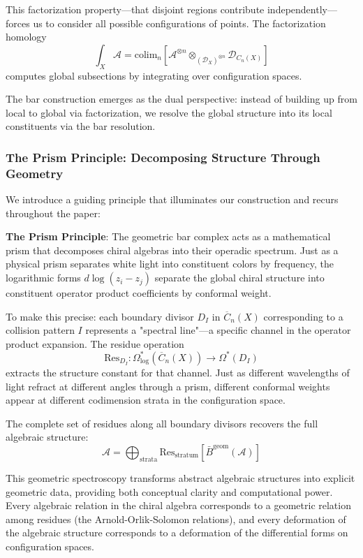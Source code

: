 This factorization property—that disjoint regions contribute independently—forces us to consider all possible configurations of points. The factorization homology
$$\int_X \mathcal{A} = \text{colim}_n \left[ \mathcal{A}^{\otimes n} \otimes_{(\mathcal{D}_X)^{\otimes n}} \mathcal{D}_{C_n(X)} \right]$$
computes global subsections by integrating over configuration spaces.

The bar construction emerges as the dual perspective: instead of building up from local to global via factorization, we resolve the global structure into its local constituents via the bar resolution.

\subsubsection{The Prism Principle: Decomposing Structure Through Geometry}

We introduce a guiding principle that illuminates our construction and recurs throughout the paper:

\textbf{The Prism Principle}: The geometric bar complex acts as a mathematical prism that decomposes chiral algebras into their operadic spectrum. Just as a physical prism separates white light into constituent colors by frequency, the logarithmic forms $d\log(z_i - z_j)$ separate the global chiral structure into constituent operator product coefficients by conformal weight.

To make this precise: each boundary divisor $D_I$ in $\overline{C}_n(X)$ corresponding to a collision pattern $I$ represents a "spectral line"—a specific channel in the operator product expansion. The residue operation
$$\text{Res}_{D_I}: \Omega^*_{\text{log}}(\overline{C}_n(X)) \to \Omega^*(D_I)$$
extracts the structure constant for that channel. Just as different wavelengths of light refract at different angles through a prism, different conformal weights appear at different codimension strata in the configuration space.

The complete set of residues along all boundary divisors recovers the full algebraic structure:
$$\mathcal{A} = \bigoplus_{\text{strata}} \text{Res}_{\text{stratum}}[\bar{B}^{\text{geom}}(\mathcal{A})]$$

This geometric spectroscopy transforms abstract algebraic structures into explicit geometric data, providing both conceptual clarity and computational power. Every algebraic relation in the chiral algebra corresponds to a geometric relation among residues (the Arnold-Orlik-Solomon relations), and every deformation of the algebraic structure corresponds to a deformation of the differential forms on configuration spaces.

